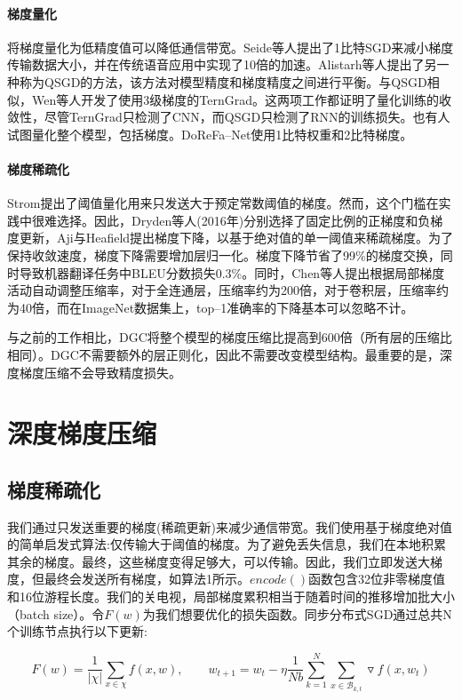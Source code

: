 \paragraph{梯度量化}
将梯度量化为低精度值可以降低通信带宽。Seide等人提出了1比特SGD来减小梯度传输数据大小，并在传统语音应用中实现了10倍的加速。Alistarh等人提出了另一种称为QSGD的方法，该方法对模型精度和梯度精度之间进行平衡。与QSGD相似，Wen等人开发了使用3级梯度的TernGrad。这两项工作都证明了量化训练的收敛性，尽管TernGrad只检测了CNN，而QSGD只检测了RNN的训练损失。也有人试图量化整个模型，包括梯度。DoReFa--Net使用1比特权重和2比特梯度。

\paragraph{梯度稀疏化}
Strom提出了阈值量化用来只发送大于预定常数阈值的梯度。然而，这个门槛在实践中很难选择。因此，Dryden等人(2016年)分别选择了固定比例的正梯度和负梯度更新，Aji与Heafield提出梯度下降，以基于绝对值的单一阈值来稀疏梯度。为了保持收敛速度，梯度下降需要增加层归一化。梯度下降节省了99\%的梯度交换，同时导致机器翻译任务中BLEU分数损失0.3\%。同时，Chen等人提出根据局部梯度活动自动调整压缩率，对于全连通层，压缩率约为200倍，对于卷积层，压缩率约为40倍，而在ImageNet数据集上，top--1准确率的下降基本可以忽略不计。

与之前的工作相比，DGC将整个模型的梯度压缩比提高到600倍（所有层的压缩比相同）。DGC不需要额外的层正则化，因此不需要改变模型结构。最重要的是，深度梯度压缩不会导致精度损失。

\section{深度梯度压缩}

\subsection{梯度稀疏化}
我们通过只发送重要的梯度(稀疏更新)来减少通信带宽。我们使用基于梯度绝对值的简单启发式算法:仅传输大于阈值的梯度。为了避免丢失信息，我们在本地积累其余的梯度。最终，这些梯度变得足够大，可以传输。因此，我们立即发送大梯度，但最终会发送所有梯度，如算法1所示。$encode()$函数包含32位非零梯度值和16位游程长度。我们的关电视，局部梯度累积相当于随着时间的推移增加批大小（batch size）。令$F(w)$为我们想要优化的损失函数。同步分布式SGD通过总共N个训练节点执行以下更新:

\begin{equation}
	\label{eq:dsgd}
	F(w) = \frac{1}{\left|\chi \right|} \sum_{x \in \chi} f(x, w), \qquad
	w_{t+1} = w_{t} - \eta \frac{1}{Nb} \sum_{k=1}^{N}\sum_{x \in \mathcal{B}_{k, t}} \triangledown f(x, w_{t})
\end{equation}

